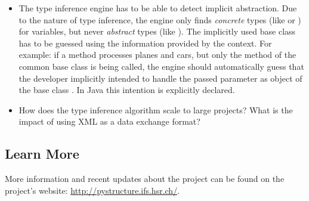 \documentclass[12pt,halfparskip]{scrartcl}
\begin{document}
\begin{itemize}
	\item The type inference engine has to be able to detect implicit abstraction. Due to the nature of type inference, the engine only finds \emph{concrete} types (like  or ) for variables, but never \emph {abstract} types (like ). The implicitly used base class has to be guessed using the information provided by the context. For example: if a method processes planes and cars, but only the method  of the common base class  is being called, the engine should automatically guess that the developer implicitly intended to handle the passed parameter as object of the base class . In Java this intention is explicitly declared.
	\item How does the type inference algorithm scale to large projects? What is the impact of using XML as a data exchange format?
\end{itemize}

\subsection*{Learn More}

More information and recent updates about the project can be found on the project's website: \url{http://pystructure.ifs.hsr.ch/}.
\end{document}
